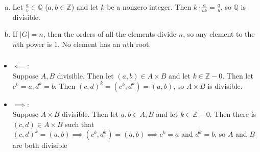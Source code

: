 \documentclass{article}
\newcommand{\ints}{\mathbb{Z}}
\newcommand{\rats}{\mathbb{Q}}
\newcommand{\norm}[1]{|#1|}
\begin{document}
\subsubsection{}\label{ex4p19}
\begin{enumerate}[(a)]
\item Let $\frac{a}{b}\in\rats$ ($a,b\in\ints$) and let $k$ be a nonzero integer. Then $k\cdot \frac{a}{bk} = \frac{a}{b}$, so $\rats$ is divisible.
\item
If $\norm{G}=n$, then the orders of all the elements divide $n$, so any element to the $n$th power is $1$. No element has an $n$th root.
\end{enumerate}
\subsubsection{}\label{ex4p20}
\begin{itemize}
\item $\impliedby$:\\
Suppose $A,B$ divisible. Then let $(a,b)\in A\times B$ and let $k \in \ints-0$. Then let $c^k=a, d^k=b$. Then $(c,d)^k = (c^k,d^k) = (a,b)$, so $A\times B$ is divisible.
\item $\implies$:\\
Suppose $A\times B$ divisible. Then let $a, b \in A, B$ and let $k \in \ints-0$. Then there is $(c,d) \in A\times B$ such that $(c,d)^k = (a,b) \implies (c^k, d^k) =(a,b) \implies c^k=a$ and $d^k=b$, so $A$ and $B$ are both divisible
\end{itemize}
\end{document}
